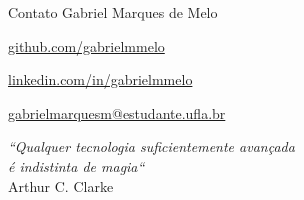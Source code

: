 \documentclass{beamer}
\begin{document}
\begin{frame}{Contato}
{\centering Gabriel Marques de Melo \hspace{190pt}{\Large \color{black} \faLinux}}
    \vspace{15pt}
	\item {\huge \faGithub} \url{github.com/gabrielmmelo}
	\vspace{15pt}
	\item {\huge \faLinkedin} \url{linkedin.com/in/gabrielmmelo} 
	\vspace{15pt}
	\item {\huge \faEnvelopeO} \url{gabrielmarquesm@estudante.ufla.br} 
\vspace{15pt}
\begin{center}
    \small
    \textit{``Qualquer tecnologia suficientemente avançada \\
    é indistinta de magia``} \\
    \vspace{5pt}
    \footnotesize Arthur C. Clarke 
\end{center}	
	
\end{frame}
\end{document}
